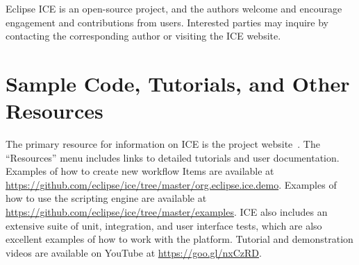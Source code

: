 Eclipse ICE is an open-source project, and the authors welcome and encourage
engagement and contributions from users. Interested parties may inquire by
contacting the corresponding author or visiting the ICE website.

\section{Sample Code, Tutorials, and Other
Resources}\label{sample-code-tutorials-and-other-resources}

The primary resource for information on ICE is the project 
website~\cite{billings_eclipse_2016}. The ``Resources'' menu includes links to
detailed tutorials and user documentation. Examples of how to create
new workflow Items are available at
\url{https://github.com/eclipse/ice/tree/master/org.eclipse.ice.demo}.
Examples of how to use the scripting engine are available at
\url{https://github.com/eclipse/ice/tree/master/examples}. ICE also includes an
extensive suite of unit, integration, and user interface tests, which are
also excellent examples of how to work with the platform. Tutorial and
demonstration videos are available on YouTube at \url{https://goo.gl/nxCzRD}.